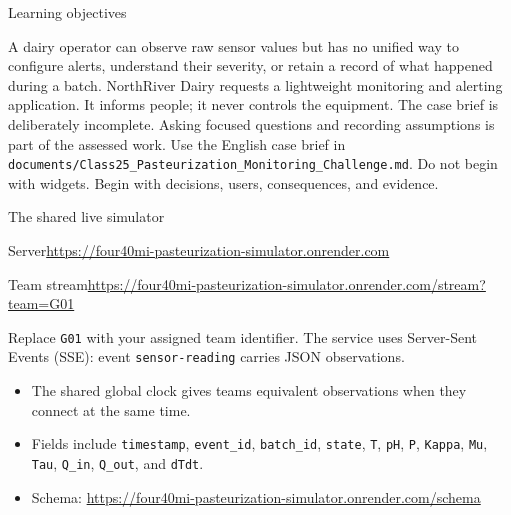 \begin{frame}{Learning objectives}
\coursefooter
\end{frame}

\coursecontextframe
{A dairy operator can observe raw sensor values but has no unified way to configure alerts, understand their severity, or retain a record of what happened during a batch.}
{NorthRiver Dairy requests a lightweight monitoring and alerting application. It informs people; it never controls the equipment.}
{The case brief is deliberately incomplete. Asking focused questions and recording assumptions is part of the assessed work.}
{Use the English case brief in \texttt{documents/Class25\_Pasteurization\_Monitoring\_Challenge.md}.}
{Do not begin with widgets. Begin with decisions, users, consequences, and evidence.}

\begin{frame}{The shared live simulator}
\begin{block}{Server}\url{https://four40mi-pasteurization-simulator.onrender.com}\end{block}
\begin{block}{Team stream}\url{https://four40mi-pasteurization-simulator.onrender.com/stream?team=G01}\end{block}
Replace \texttt{G01} with your assigned team identifier. The service uses Server-Sent Events (SSE): event \texttt{sensor-reading} carries JSON observations.
\begin{itemize}
\item The shared global clock gives teams equivalent observations when they connect at the same time.
\item Fields include \texttt{timestamp}, \texttt{event\_id}, \texttt{batch\_id}, \texttt{state}, \texttt{T}, \texttt{pH}, \texttt{P}, \texttt{Kappa}, \texttt{Mu}, \texttt{Tau}, \texttt{Q\_in}, \texttt{Q\_out}, and \texttt{dTdt}.
\item Schema: \url{https://four40mi-pasteurization-simulator.onrender.com/schema}
\end{itemize}
\coursefooter
\end{frame}

